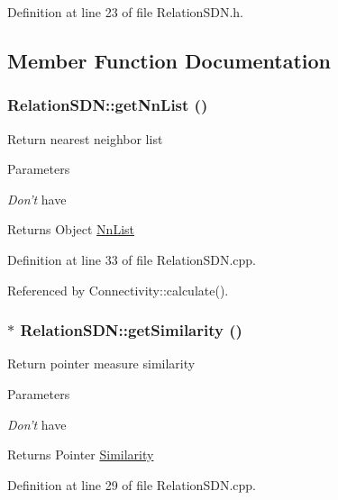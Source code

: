 Definition at line 23 of file RelationSDN.h.

\subsection{Member Function Documentation}
\hypertarget{classRelationSDN_a7d4ae265a19587306975a8cdac7bb115}{
\subsubsection[{getNnList}]{ RelationSDN::getNnList ()}}
\label{classRelationSDN_a7d4ae265a19587306975a8cdac7bb115}
Return nearest neighbor list 
\begin{DoxyParams}{Parameters}
\item[{\em Don't}]have \end{DoxyParams}
\begin{DoxyReturn}{Returns}
Object \hyperlink{classNnList}{NnList} 
\end{DoxyReturn}


Definition at line 33 of file RelationSDN.cpp.

Referenced by Connectivity::calculate().\hypertarget{classRelationSDN_a8db644a112eae5dd35c2ca0e47d36ce1}{
\subsubsection[{getSimilarity}]{ $\ast$ RelationSDN::getSimilarity ()}}
\label{classRelationSDN_a8db644a112eae5dd35c2ca0e47d36ce1}
Return pointer measure similarity 
\begin{DoxyParams}{Parameters}
\item[{\em Don't}]have \end{DoxyParams}
\begin{DoxyReturn}{Returns}
Pointer \hyperlink{classSimilarity}{Similarity} 
\end{DoxyReturn}


Definition at line 29 of file RelationSDN.cpp.

